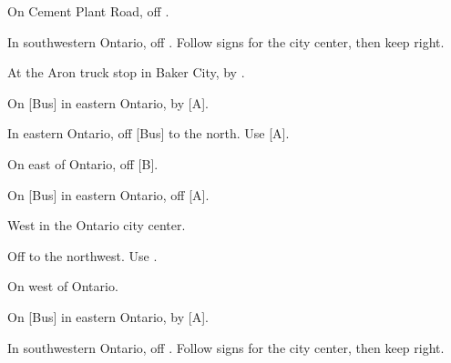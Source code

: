 

\begin{LocationList}

On Cement Plant Road, off  .

In southwestern Ontario, off . Follow signs for the city center, then keep right.

At the Aron truck stop in Baker City, by  .

\Location{\GarageHQ \Garage}
On [Bus] in eastern Ontario, by  [A].

In eastern Ontario, off [Bus] to the north. Use  [A].

On  east of Ontario, off  [B].

On [Bus] in eastern Ontario, off  [A].

\Location{\RecruitmentAgency \Recruitment}
West in the Ontario city center.

Off  to the northwest. Use  .

On  west of Ontario.

\Location{\TruckStop \Gas \Rest \Service \Weigh}
On [Bus] in eastern Ontario, by  [A].

In southwestern Ontario, off . Follow signs for the city center, then keep right.

\end{LocationList}
